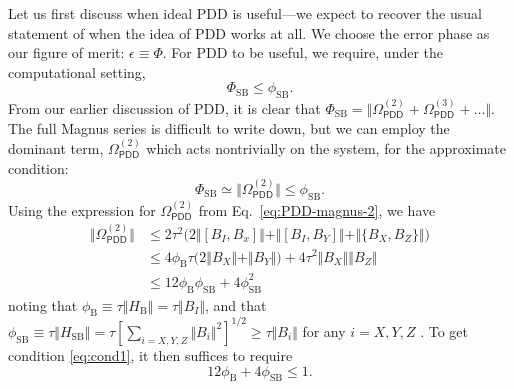 \documentclass[twocolumn,pra,superscriptaddress]{revtex4-2}
\newcommand{\Opdd}{\Omega_{\mathsf{PDD}}}
\newcommand{\ep}{\Phi_\mathrm{SB}}
\newcommand{\phiSB}{\phi_\mathrm{SB}}
\newcommand{\phiB}{\phi_\mathrm{B}}
\begin{document}
Let us first discuss when ideal PDD is useful---we expect to recover the usual statement of when the idea of PDD works at all. We choose the error phase as our figure of merit: $\epsilon\equiv \Phi$. For PDD to be useful, we require, under the computational setting, 
\begin{equation}
\ep\leq \phiSB.
\end{equation}
From our earlier discussion of PDD, it is clear that $\ep=\Vert \Opdd^{(2)}+\Opdd^{(3)}+\ldots\Vert$. The full Magnus series is difficult to write down, but we can employ the dominant term, $\Opdd^{(2)}$ which acts nontrivially on the system, for the approximate condition:
\begin{equation}\label{eq:cond1}
\ep\simeq\Vert \Opdd^{(2)}\Vert\leq \phiSB.
\end{equation}
Using the expression for $\Opdd^{(2)}$ from Eq.~\eqref{eq:PDD-magnus-2}, we have
\begin{align}
\Vert\Opdd^{(2)}\Vert&\leq 2\tau^2{\bigl(2\Vert[B_I,B_x]\Vert+\Vert[B_I,B_Y]\Vert +\Vert\{B_X,B_Z\}\Vert\bigr)}\nonumber\\
&\leq 4\phiB\tau\bigl(2\Vert B_X\Vert +\Vert B_Y\Vert\bigr) +4\tau^2\Vert B_X\Vert\Vert B_Z\Vert\nonumber\\
&\leq 12\phiB\phiSB+4\phiSB^2\label{eq:Opdd2}
\end{align}
noting that $\phiB\equiv \tau\Vert H_\mathrm{B}\Vert =\tau\Vert B_I\Vert$, and that $\phiSB\equiv \tau\Vert H_\mathrm{SB}\Vert=\tau{\left[\sum_{i=X,Y,Z}\Vert B_i\Vert^2\right]}^{1/2}\geq \tau\Vert B_i\Vert$ for any $i=X,Y,Z$ .
To get condition \eqref{eq:cond1}, it then suffices to require
\begin{equation}
12\phiB+4\phiSB\leq1.
\end{equation}
\end{document}
